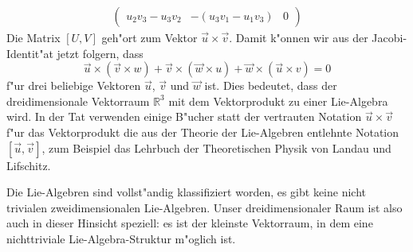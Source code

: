 \begin{beispiel}
\begin{align*}
\begin{pmatrix}
u_2v_3 - u_3v_2         
	&-( u_3v_1 - u_1v_3)
		& 0
\end{pmatrix}
\end{align*}
Die Matrix $[U,V]$ geh"ort zum Vektor $\vec u\times\vec v$.
Damit k"onnen wir aus der Jacobi-Identit"at jetzt folgern, dass
\[
\vec u\times(\vec v\times w)
+
\vec v\times(\vec w\times u)
+
\vec w\times(\vec u\times v)
=0
\]
f"ur drei beliebige Vektoren $\vec u$, $\vec v$ und $\vec w$ ist.
Dies bedeutet, dass der dreidimensionale Vektorraum $\mathbb R^3$
mit dem Vektorprodukt zu einer Lie-Algebra wird.
In der Tat verwenden einige B"ucher statt der vertrauten Notation
$\vec u\times \vec v$ f"ur das Vektorprodukt die aus der Theorie der
Lie-Algebren entlehnte Notation $[\vec u,\vec v]$, zum Beispiel
das Lehrbuch der Theoretischen Physik \cite{skript:landaulifschitz1}
von Landau und Lifschitz.

Die Lie-Algebren sind vollst"andig klassifiziert worden, es gibt
keine nicht trivialen zweidimensionalen Lie-Algebren.
Unser dreidimensionaler Raum ist also auch in dieser Hinsicht speziell:
es ist der kleinste Vektorraum, in dem eine nichttriviale Lie-Algebra-Struktur
m"oglich ist.
\end{beispiel}

